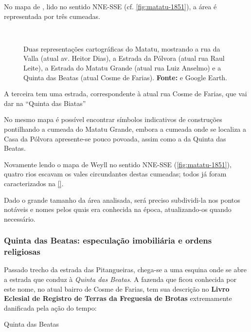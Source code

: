 \begin{citacao}
No mapa de , lido no sentido NNE-SSE (cf. \autoref{fig:matatu-1851}), a área é representada por três cumeadas. 

\begin{figure}[!htp]
\centering
{}
\  %
\caption{Duas representações cartográficas do Matatu, mostrando a rua da Valla (atual av. Heitor Dias), a Estrada da Pólvora (atual rua Raul Leite), a Estrada do Matatu Grande (atual rua Luiz Anselmo) e a Quinta das Beatas (atual Cosme de Farias). \textbf{Fonte:}  e Google Earth.}
\end{figure}

A terceira tem uma estrada, correspondente à atual rua Cosme de Farias, que vai dar na ``Quinta das Biatas''
 
No mesmo mapa é possível encontrar símbolos indicativos de construções pontilhando a cumeada do Matatu Grande, embora a cumeada onde se localiza a Casa da Pólvora apresente-se pouco povoada, assim como a da Quinta das Beatas.

Novamente lendo o mapa de Weyll no sentido NNE-SSE (\autoref{fig:matatu-1851}), quatro rios escavam os vales circundantes destas cumeadas; todos já foram caracterizados na \autoref{}. 

Dado o grande tamanho da área analisada, será preciso subdividi-la nos pontos notáveis e nomes pelos quais era conhecida na época, atualizando-os quando necessário.

\subsubsection{Quinta das Beatas: especulação imobiliária e ordens religiosas}

Passado trecho da estrada das Pitangueiras, chega-se a uma esquina onde se abre a estrada que conduz à \textit{Quinta das Beatas}. A fazenda que ficou conhecida por este nome, no atual bairro de Cosme de Farias, tem sua descrição no \textbf{Livro Eclesial de Registro de Terras da Freguesia de Brotas} extremamente danificada pela ação do tempo:

\begin{citacao}
Quinta das Beatas


\end{citacao}
\end{citacao}
